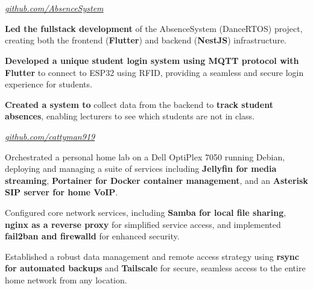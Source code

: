 \documentclass[../main.tex]{subfiles}
\begin{document}
\section{}

\begin{twocolentry}{
    \small
    \textit{\href{https://github.com/cattyman919/AbsenceSystem/tree/main}{github.com/AbsenceSystem}}
}
\end{twocolentry}

\vspace{0.10 cm}
\begin{onecolentry}
\begin{highlights}
    \item \textbf{Led the fullstack development} of the AbsenceSystem (DanceRTOS) project, creating both the frontend (\textbf{Flutter}) and backend (\textbf{NestJS}) infrastructure.
    \item \textbf{Developed a unique student login system using MQTT protocol with Flutter} to connect to ESP32 using RFID, providing a seamless and secure login experience for students.
    \item \textbf{Created a system to} collect data from the backend to \textbf{track student absences}, enabling lecturers to see which students are not in class.
\end{highlights}
\end{onecolentry}

\vspace{0.2 cm}

\begin{twocolentry}{
    \small
    \textit{\href{https://github.com/cattyman919/}{github.com/cattyman919}}
}
\end{twocolentry}

\vspace{0.10 cm}
\begin{onecolentry}
\begin{highlights}
    \item Orchestrated a personal home lab on a Dell OptiPlex 7050 running Debian, deploying and managing a suite of services including \textbf{Jellyfin for media streaming}, \textbf{Portainer for Docker container management}, and an \textbf{Asterisk SIP server for home VoIP}.
    \item Configured core network services, including \textbf{Samba for local file sharing}, \textbf{nginx as a reverse proxy} for simplified service access, and implemented \textbf{fail2ban and firewalld} for enhanced security.
    \item Established a robust data management and remote access strategy using \textbf{rsync for automated backups} and \textbf{Tailscale} for secure, seamless access to the entire home network from any location.
\end{highlights}
\end{onecolentry}
\end{document}
